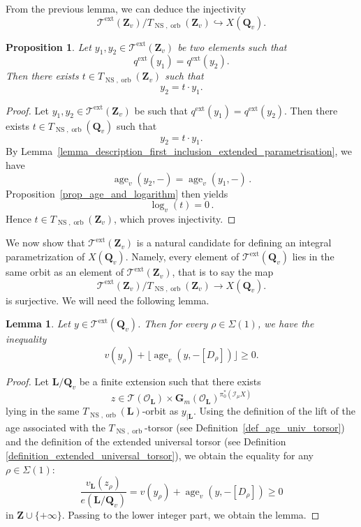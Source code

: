 \documentclass{proc-l}
\newcommand{\Z}{\mathbf{Z}}
\newcommand{\Q}{\mathbf{Q}}
\newcommand{\Le}{\mathbf{L}}
\newcommand{\G}{\mathbf{G}}
\DeclareMathOperator{\age}{age}
\DeclareMathOperator{\NS}{NS}
\DeclareMathOperator{\orb}{orb}
\DeclareMathOperator{\ext}{ext}
\newcommand{\stackT}{\mathcal{T}}
\newcommand{\sheafI}{\mathcal{I}}
\newcommand{\sheafO}{\mathcal{O}}
\newcommand{\twistsector}{\pi_0^*(\sheafI_{\mu} X)}
\newtheorem{lemma}[theorem]{Lemma}
\newtheorem{prop}[theorem]{Proposition}
\theoremstyle{definition}
\theoremstyle{remark}
\numberwithin{equation}{section}
\begin{document}
From the previous lemma, we can deduce the injectivity
\[
\stackT^{\ext}(\Z_v) / T_{\NS,\orb}(\Z_v) \hookrightarrow X(\Q_v).
\]

\begin{prop}\label{prop_injectivite_local_extended_parametrisation}
Let $y_1, y_2 \in \stackT^{\ext}(\Z_v)$ be two elements such that
$$q^{\ext}(y_1) = q^{\ext}(y_2) .$$Then there exists $t \in T_{\NS,\orb}(\Z_v)$ such that
\[
y_2 = t \cdot y_1 .
\]
\end{prop}

\begin{proof}
Let $y_1, y_2 \in \stackT^{\ext}(\Z_v)$ be such that
$q^{\ext}(y_1) = q^{\ext}(y_2)$. Then there exists $t \in T_{\NS,\orb}(\Q_v)$ such that
\[
y_2 = t \cdot y_1 .
\]By
Lemma~\ref{lemma_description_first_inclusion_extended_parametrisation}, we have
\[
\age_v(y_2,-) = \age_v(y_1,-) \, .
\]
Proposition~\ref{prop_age_and_logarithm} then yields
\[
\log_v(t) = 0 \, .
\]
Hence $t \in T_{\NS,\orb}(\Z_v)$, which proves injectivity.

\end{proof}

We now show that $\stackT^{\ext}(\Z_v)$ is a natural candidate for defining an integral parametrization of $X(\Q_v)$. Namely, every element of $\stackT^{\ext}(\Q_v)$ lies in the same orbit as an element of $\stackT^{\ext}(\Z_v)$, that is to say the map \[
\stackT^{\ext}(\Z_v) / T_{\NS,\orb}(\Z_v) \rightarrow X(\Q_v).
\]is surjective. We will need the following lemma.

\begin{lemma}\label{lemma_inequality_valuation_plus_age}
Let $y \in \stackT^{\ext}(\Q_v)$. Then for every $\rho \in \Sigma(1)$, we have the inequality
\[
v(y_{\rho}) + \lfloor \age_v(y,-[D_{\rho}]) \rfloor \geqslant 0 .
\]
\end{lemma}

\begin{proof}
Let $\Le/\Q_v$ be a finite extension such that there exists
\[
z \in \stackT(\sheafO_{\Le}) \times \G_m(\sheafO_{\Le})^{\twistsector}
\]
lying in the same $T_{\NS,\orb}(\Le)$-orbit as $y_{|\Le}$. Using the definition of the lift of the age associated with the $T_{\NS,\orb}$-torsor (see Definition~\ref{def_age_univ_torsor}) and the definition of the extended universal torsor (see Definition \ref{definition_extended_universal_torsor}), we obtain the equality for any $\rho \in \Sigma(1)$:
\[
\frac{v_{\Le}(z_{\rho})}{e(\Le/\Q_v)}
=
v(y_{\rho}) + \age_v(y,-[D_{\rho}]) \geqslant 0
\]
in $\Z \cup \{+\infty\} $. Passing to the lower integer part, we obtain the lemma.

\end{proof}
\end{document}

